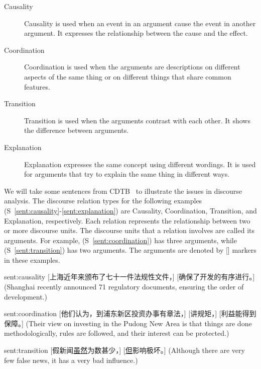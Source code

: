 \begin{description}
\item[Causality] Causality is used when an event in an argument cause the event
    in another argument. It expresses the relationship between the cause
    and the effect.
\item[Coordination] Coordination is used when the arguments are
    descriptions on different aspects of the same thing or
    on different things that share common features.
\item[Transition] Transition is used when the arguments contrast with each other.
    It shows the difference between arguments.
\item[Explanation] Explanation expresses the same concept using different wordings.
    It is used for arguments that try to explain the same thing in different
    ways.
\end{description}


We will take some sentences from CDTB~\citep{li2014building} to illustrate the issues
in discourse analysis. The discourse relation types for the following examples
(S~\ref{sent:causality}-\ref{sent:explanation}) are
Causality, Coordination, Transition, and Explanation, respectively.
Each relation represents the relationship between two or more discourse units.
The discourse units that a relation involves are called its arguments.
For example, (S~\ref{sent:coordination}) has
three arguments, while (S~\ref{sent:transition}) has two arguments. The arguments are
denoted by [] markers in these examples.

\begin{sent}{sent:causality}{}
    [上海近年来颁布了七十一件法规性文件，] [确保了开发的有序进行。]
    (Shanghai recently announced 71 regulatory documents, ensuring
    the order of development.)
\end{sent}

\begin{sent}{sent:coordination}{}
    [他们认为，到浦东新区投资办事有章法，] [讲规矩，] [利益能得到保障。]
    (Their view on investing in the Pudong New Area is that
    things are done methodologically,
    rules are followed, and their interest can be protected.)
\end{sent}

\begin{sent}{sent:transition}{}
    [假新闻\underline{虽然}为数甚少，] [\underline{但}影响极坏。]
    (Although there are very few false news, it has a very bad influence.)
\end{sent}

